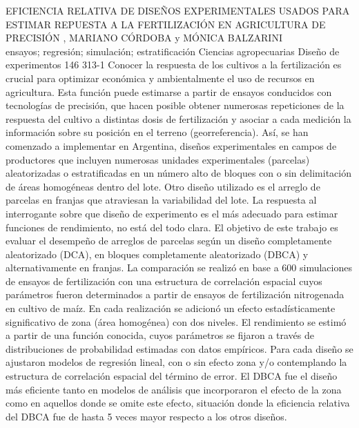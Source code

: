 \A
{EFICIENCIA RELATIVA DE DISEÑOS EXPERIMENTALES USADOS PARA ESTIMAR REPUESTA A LA FERTILIZACIÓN EN AGRICULTURA DE PRECISIÓN}
{, MARIANO CÓRDOBA y MÓNICA BALZARINI}
{
\\}
{ensayos; regresión; simulación; estratificación} 
 {Ciencias agropecuarias} 
 {Diseño de experimentos} 
 {146} 
 {313-1}
{Conocer la respuesta de los cultivos a la fertilización es crucial para optimizar económica y ambientalmente el uso de recursos en agricultura. Esta función puede estimarse a partir de ensayos conducidos con tecnologías de precisión, que hacen posible obtener numerosas repeticiones de la respuesta del cultivo a distintas dosis de fertilización y asociar a cada medición la información sobre su posición en el terreno (georreferencia). Así, se han comenzado a implementar en Argentina, diseños experimentales en campos de productores que incluyen numerosas unidades experimentales (parcelas) aleatorizadas o estratificadas en un número alto de bloques con o sin delimitación de áreas homogéneas dentro del lote. Otro diseño utilizado es el arreglo de parcelas en franjas que atraviesan la variabilidad del lote. La respuesta al interrogante sobre que diseño de experimento es el más adecuado para estimar funciones de rendimiento, no está del todo clara. El objetivo de este trabajo es evaluar el desempeño de arreglos de parcelas según un diseño completamente aleatorizado (DCA), en bloques completamente aleatorizado (DBCA) y alternativamente en franjas. La comparación se realizó en base a 600 simulaciones de ensayos de fertilización con una estructura de correlación espacial cuyos parámetros fueron determinados a partir de ensayos de fertilización nitrogenada en cultivo de maíz. En cada realización se adicionó un efecto estadísticamente significativo de zona (área homogénea) con dos niveles. El rendimiento se estimó a partir de una función conocida, cuyos parámetros se fijaron a través de distribuciones de probabilidad estimadas con datos empíricos. Para cada diseño se ajustaron modelos de regresión lineal, con o sin efecto zona y/o contemplando la estructura de correlación espacial del término de error. El DBCA fue el diseño más eficiente tanto en modelos de análisis que incorporaron el efecto de la zona como en aquellos donde se omite este efecto, situación donde la eficiencia relativa del DBCA fue de hasta 5 veces mayor respecto a los otros diseños.}
